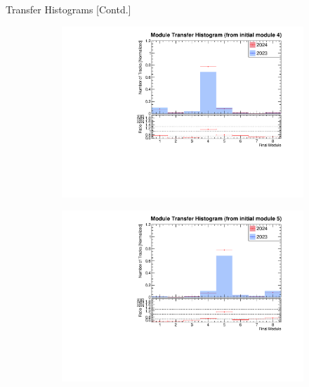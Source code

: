 \begin{frame}{Transfer Histograms [Contd.]}
\begin{figure}
        \begin{subfigure}[t]{0.49\linewidth}
            \includegraphics[width=\linewidth]{./ModuleLevelPlots/final_module_from_st0_module4.pdf}
        \end{subfigure}
        \begin{subfigure}[t]{0.49\linewidth}
            \includegraphics[width=\linewidth]{./ModuleLevelPlots/final_module_from_st0_module5.pdf}
        \end{subfigure}
    \end{figure}
\end{frame}


